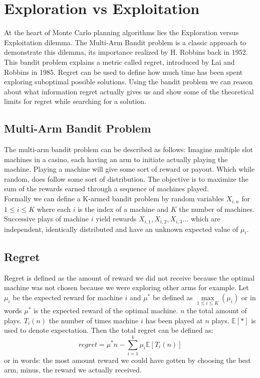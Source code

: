 \documentclass[
11pt, %
english, %
singlespacing, %
headsepline, %
]{MastersDoctoralThesis} %
\newcommand\IE{\mathbb{E}}
\begin{document}
\section{Exploration vs Exploitation}
At the heart of Monte Carlo planning algorithms lies the Exploration versus Exploitation dilemma. The Multi-Arm Bandit problem is a classic approach to demonstrate this dilemma, its importance realized by H. Robbins back in 1952. This bandit problem explains a metric called regret, introduced by Lai and Robbins\cite{Lai+Robbins:1985} in 1985. Regret can be used to define how much time has been spent exploring suboptimal possible solutions. Using the bandit problem we can reason about what information regret actually gives us and show some of the theoretical limits for regret while searching for a solution.

\subsection{Multi-Arm Bandit Problem}
The multi-arm bandit problem can be described as follows: Imagine multiple slot machines in a casino, each having an arm to initiate actually playing the machine. Playing a machine will give some sort of reward or payout. Which while random, does follow some sort of distribution. The objective is to maximize the sum of the rewards earned through a sequence of machines played.\\

Formally we can define a K-armed bandit problem by random variables $X_{i,n}$ for $1 \leq i \leq K$ where each $i$ is the index of a machine and $K$ the number of machines. Successive plays of machine $i$ yield rewards $X_{i,1},X_{i,2},X_{i,3}...$ which are independent, identically distributed and have an unknown expected value of $\mu_i$.

\subsection{Regret}
Regret is defined as the amount of reward we did not receive because the optimal machine was not chosen because we were exploring other arms for example. Let $\mu_i$ be the expected reward for machine $i$ and $\mu^{*}$ be defined as $\max\limits_{1 \leq i \leq K} (\mu_i)$ or in words $\mu^{*}$ is the expected reward of the optimal machine. $n$ the total amount of plays. $T_i(n)$ the number of times machine $i$ has been played at $n$ plays. $\IE[*]$ is used to denote expectation. Then the total regret can be defined as:
\[
    regret = \mu^*n - \sum_{i=1}^{k}\mu_i\IE[T_i(n)]
\]
or in words: the most amount reward we could have gotten by choosing the best arm, minus, the reward we actually received.\\
\end{document}
